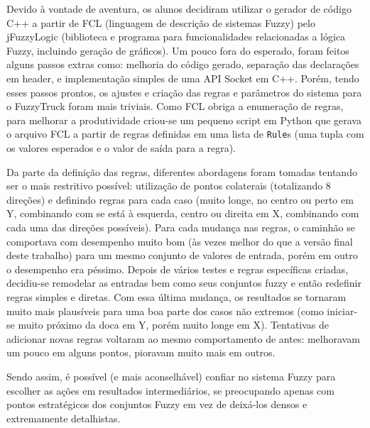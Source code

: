 \documentclass[twocolumn]{article}
\begin{document}
    Devido à vontade de aventura, os alunos decidiram utilizar o gerador de
    código C++ a partir de FCL (linguagem de descrição de sistemas Fuzzy) pelo
    jFuzzyLogic (biblioteca e programa para funcionalidades relacionadas a
    lógica Fuzzy, incluindo geração de gráficos). Um pouco fora do esperado,
    foram feitos alguns passos extras como: melhoria do código gerado,
    separação das declarações em header, e implementação simples de uma API
    Socket em C++. Porém, tendo esses passos prontos, os ajustes e criação das
    regras e parâmetros do sistema para o FuzzyTruck foram mais triviais. Como
    FCL obriga a enumeração de regras, para melhorar a produtividade criou-se
    um pequeno script em Python que gerava o arquivo FCL a partir de regras
    definidas em uma lista de \texttt{Rule}s (uma tupla com os valores
    esperados e o valor de saída para a regra).

    Da parte da definição das regras, diferentes abordagens foram tomadas
    tentando ser o mais restritivo possível: utilização de pontos colaterais
    (totalizando 8 direções) e definindo regras para cada caso (muito longe, no
    centro ou perto em Y, combinando com se está à esquerda, centro ou direita
    em X, combinando com cada uma das direções possíveis). Para cada mudança
    nas regras, o caminhão se comportava com desempenho muito bom (às vezes
    melhor do que a versão final deste trabalho) para um mesmo conjunto de
    valores de entrada, porém em outro o desempenho era péssimo. Depois de
    vários testes e regras específicas criadas, decidiu-se remodelar as
    entradas bem como seus conjuntos fuzzy e então redefinir regras simples e
    diretas. Com essa última mudança, os resultados se tornaram muito mais
    plausíveis para uma boa parte dos casos não extremos (como iniciar-se muito
    próximo da doca em Y, porém muito longe em X). Tentativas de adicionar
    novas regras voltaram ao mesmo comportamento de antes: melhoravam um pouco
    em alguns pontos, pioravam muito mais em outros.

    Sendo assim, é possível (e mais aconselhável) confiar no sistema Fuzzy para
    escolher as ações em resultados intermediários, se preocupando apenas com
    pontos estratégicos dos conjuntos Fuzzy em vez de deixá-los densos e
    extremamente detalhistas.

    
    
    \nocite{*}
\end{document}
